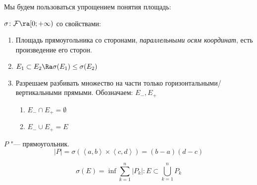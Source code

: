 Мы будем пользоваться упрощением понятия площадь:
\begin{Def}
	$\sigma\colon \mathcal{F} \ra [0; +\infty)$ со свойствами:
	\begin{enumerate}
	\item
		Площадь прямоугольника со сторонами, \textit{параллельными осям координат}, есть произведение его сторон.

	\item
		$E_1 \subset E_2 \Ra \sigma(E_1) \le \sigma(E_2)$

	\item
		Разрешаем разбивать множество на части только горизонтальными/вертикальными прямыми. Обозначаем: $E_{-}, E_{+}$
		\begin{enumerate}
			\item $E_{-} \cap E_{+} = \emptyset$
			\item $E_{-} \cup E_{+} = E$
		\end{enumerate}
	\end{enumerate}
\end{Def}

\begin{Def}
	$P$ "--- прямоугольник.
	\[ |P| = \sigma(\left<a, b\right> \times \left<c, d\right>) = (b - a)(d - c) \]
\end{Def}

\begin{Def}
	\[ \sigma(E) = \inf{\sum_{k = 1}^n |P_k|: E \subset \bigcup_{k = 1}^n P_k} \]
\end{Def}

